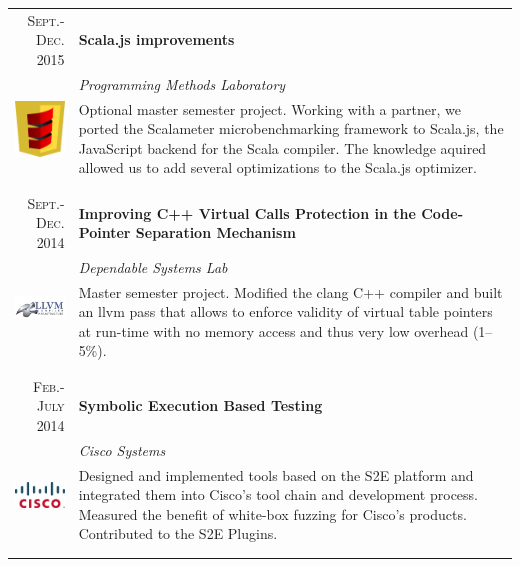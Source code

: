\documentclass[a4paper,11pt]{article} %
\begin{document}
\begin{tabularx}{\textwidth}{r|X}

\textsc{Sept.-Dec. 2015} & \textbf{Scala.js improvements} \\
\multirow{4}{*}{ \includegraphics[width=40pt]{img/scala-js.eps}}
& \emph{Programming Methods Laboratory}\\ 
& \footnotesize{Optional master semester project. Working with a partner, 
we ported the Scalameter microbenchmarking framework to Scala.js, the JavaScript 
backend for the Scala compiler. The knowledge aquired allowed us to
add several optimizations to the Scala.js optimizer.}\\
\multicolumn{2}{c}{} \\
\\


\textsc{Sept.-Dec. 2014} & \textbf{Improving C++ Virtual Calls Protection in the Code-Pointer Separation Mechanism} \\
\multirow{2}{*}{ \includegraphics[width=60pt]{img/llvm.eps}}
& \emph{Dependable Systems Lab}\\ 
& \footnotesize{Master semester project. Modified the clang C++ compiler and
built an llvm pass that allows to enforce validity of virtual table pointers at
run-time with no memory access and thus very low overhead (1--5\%).}\\
\multicolumn{2}{c}{} \\
\\


\textsc{Feb.-July 2014} & \textbf{Symbolic Execution Based Testing} \\
\multirow{4}{*}{ \includegraphics[width=60pt]{img/cisco.eps}}
& \emph{Cisco Systems}\\ 
& \footnotesize{Designed and implemented tools based on the S2E platform and
integrated them into Cisco's tool chain and development process. Measured the
benefit of white-box fuzzing for Cisco's products. Contributed to the S2E
Plugins.}\\
\multicolumn{2}{c}{} \\
\\


\end{tabularx}
\end{document}
